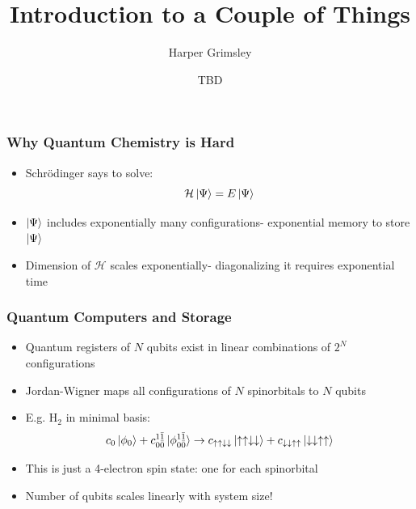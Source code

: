 \documentclass[aspectratio=169]{beamer}
\title{Introduction to a Couple of Things}
\author{Harper Grimsley}
\date{TBD}
\begin{document}
\frame{\titlepage}

\begin{frame}
	\frametitle{Why Quantum Chemistry is Hard}
	\begin{itemize}[<+->]
		\item Schr{\"o}dinger says to solve:
			\begin{equation}\nonumber
			\mathcal{H}\ket{\Psi} = E\ket{\Psi}
			\end{equation}
		\item $\ket{\Psi}$ includes exponentially many configurations- exponential memory to store $\ket{\Psi}$
		\item Dimension of $\mathcal{H}$ scales exponentially- diagonalizing it requires exponential time
	\end{itemize}
\end{frame}

\begin{frame}
	\frametitle{Quantum Computers and Storage}
	\begin{itemize}[<+->]
		\item Quantum registers of $N$ qubits exist in linear combinations of $2^N$ configurations
		\item Jordan-Wigner maps all configurations of $N$ spinorbitals to $N$ qubits
		\item E.g. H$_2$ in minimal basis:
			\begin{equation}\nonumber
				c_0\ket{\phi_0} + c_{0\bar{0}}^{1\bar{1}}\ket{\phi_{0\bar{0}}^{1\bar{1}}}\rightarrow c_{\uparrow\uparrow\downarrow\downarrow}\ket{\uparrow\uparrow\downarrow\downarrow}+c_{\downarrow\downarrow\uparrow\uparrow}\ket{\downarrow\downarrow\uparrow\uparrow}
			\end{equation}
		\item This is just a 4-electron spin state: one for each spinorbital
	        \item Number of qubits scales linearly with system size!
	\end{itemize}
\end{frame}
\end{document}
